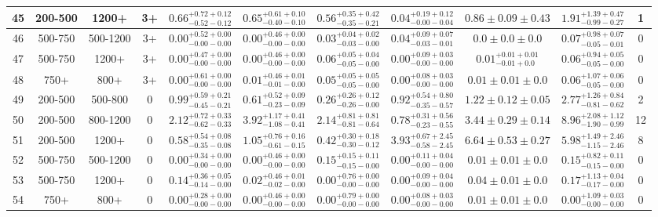 \begin{table}
{\begin{tabular}{ |c|c|c|c||c|c|c|c|c||c|c| }
45 & 200-500 & 1200+ & 3+ & $0.66^{+0.72+0.12}_{-0.52-0.12}$ & $0.65^{+0.61+0.10}_{-0.40-0.10}$ & $0.56^{+0.35+0.42}_{-0.35-0.21}$ & $0.04^{+0.19+0.12}_{-0.00-0.04}$ &$0.86\pm 0.09 \pm0.43$& $1.91^{+1.39+0.47}_{-0.99-0.27}$ & 1 \\ \hline
46 & 500-750 & 500-1200 & 3+ & $0.00^{+0.52+0.00}_{-0.00-0.00}$ & $0.00^{+0.46+0.00}_{-0.00-0.00}$ & $0.03^{+0.04+0.02}_{-0.03-0.00}$ & $0.04^{+0.09+0.07}_{-0.03-0.01}$ &$0.0\pm 0.0 \pm0.0$& $0.07^{+0.98+0.07}_{-0.05-0.01}$ & 0 \\ \hline
47 & 500-750 & 1200+ & 3+ & $0.00^{+0.47+0.00}_{-0.00-0.00}$ & $0.00^{+0.46+0.00}_{-0.00-0.00}$ & $0.06^{+0.05+0.04}_{-0.05-0.00}$ & $0.00^{+0.09+0.03}_{-0.00-0.00}$ &$0.01^{+0.01+0.01}_{-0.01+0.0}$& $0.06^{+0.94+0.05}_{-0.05-0.00}$ & 0 \\ \hline
48 & 750+ & 800+ & 3+ & $0.00^{+0.61+0.00}_{-0.00-0.00}$ & $0.01^{+0.46+0.01}_{-0.01-0.00}$ & $0.05^{+0.05+0.05}_{-0.05-0.00}$ & $0.00^{+0.08+0.03}_{-0.00-0.00}$ &$0.01\pm 0.01 \pm0.0$& $0.06^{+1.07+0.06}_{-0.05-0.00}$ & 0 \\ \hline
49 & 200-500 & 500-800 & 0 & $0.99^{+0.59+0.21}_{-0.45-0.21}$ & $0.61^{+0.52+0.09}_{-0.23-0.09}$ & $0.26^{+0.26+0.12}_{-0.26-0.00}$ & $0.92^{+0.54+0.80}_{-0.35-0.57}$ &$1.22\pm 0.12 \pm0.05$& $2.77^{+1.26+0.84}_{-0.81-0.62}$ & 2 \\ \hline
50 & 200-500 & 800-1200 & 0 & $2.12^{+0.72+0.33}_{-0.62-0.33}$ & $3.92^{+1.17+0.41}_{-1.08-0.41}$ & $2.14^{+0.81+0.81}_{-0.81-0.64}$ & $0.78^{+0.31+0.56}_{-0.23-0.55}$ &$3.44\pm 0.29 \pm0.14$& $8.96^{+2.08+1.12}_{-1.90-0.99}$ & 12 \\ \hline
51 & 200-500 & 1200+ & 0 & $0.58^{+0.54+0.08}_{-0.35-0.08}$ & $1.05^{+0.76+0.16}_{-0.61-0.15}$ & $0.42^{+0.30+0.18}_{-0.30-0.12}$ & $3.93^{+0.67+2.45}_{-0.58-2.45}$ &$6.64\pm 0.53 \pm0.27$& $5.98^{+1.49+2.46}_{-1.15-2.46}$ & 8 \\ \hline
52 & 500-750 & 500-1200 & 0 & $0.00^{+0.34+0.00}_{-0.00-0.00}$ & $0.00^{+0.46+0.00}_{-0.00-0.00}$ & $0.15^{+0.15+0.11}_{-0.15-0.00}$ & $0.00^{+0.11+0.04}_{-0.00-0.00}$ &$0.01\pm 0.01 \pm0.0$& $0.15^{+0.82+0.11}_{-0.15-0.00}$ & 0 \\ \hline
53 & 500-750 & 1200+ & 0 & $0.14^{+0.36+0.05}_{-0.14-0.00}$ & $0.02^{+0.46+0.01}_{-0.02-0.00}$ & $0.00^{+0.76+0.00}_{-0.00-0.00}$ & $0.00^{+0.09+0.04}_{-0.00-0.00}$ &$0.04\pm 0.01 \pm0.0$& $0.17^{+1.13+0.04}_{-0.17-0.00}$ & 0 \\ \hline
54 & 750+ & 800+ & 0 & $0.00^{+0.28+0.00}_{-0.00-0.00}$ & $0.00^{+0.46+0.00}_{-0.00-0.00}$ & $0.00^{+0.79+0.00}_{-0.00-0.00}$ & $0.00^{+0.08+0.03}_{-0.00-0.00}$ &$0.01\pm 0.01 \pm0.0$& $0.00^{+1.09+0.03}_{-0.00-0.00}$ & 0 \\ \hline

\end{tabular}}
\end{table}
